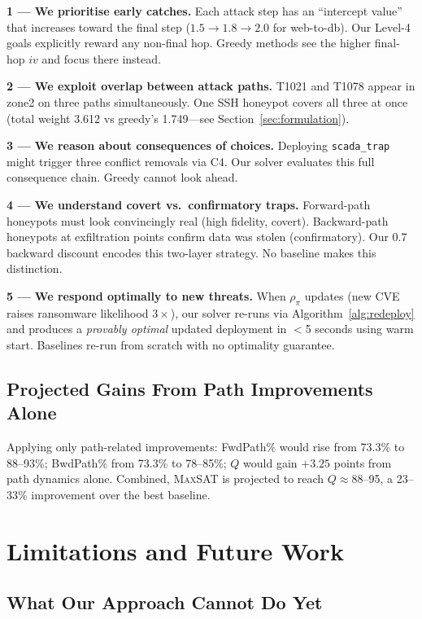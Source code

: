 \documentclass[journal]{IEEEtran}
\newcommand{\maxsat}{\textsc{MaxSAT}}
\begin{document}
\textbf{1 --- We prioritise early catches.}
Each attack step has an ``intercept value'' that increases
toward the final step ($1.5 \to 1.8 \to 2.0$ for
web-to-db).
Our Level-4 goals explicitly reward any non-final hop.
Greedy methods see the higher final-hop $iv$ and focus there
instead.

\textbf{2 --- We exploit overlap between attack paths.}
T1021 and T1078 appear in zone2 on three paths simultaneously.
One SSH honeypot covers all three at once
(total weight 3.612 vs greedy's 1.749---see
Section~\ref{sec:formulation}).

\textbf{3 --- We reason about consequences of choices.}
Deploying \texttt{scada\_trap} might trigger three conflict
removals via C4.
Our solver evaluates this full consequence chain.
Greedy cannot look ahead.

\textbf{4 --- We understand covert vs.\ confirmatory traps.}
Forward-path honeypots must look convincingly real
(high fidelity, covert).
Backward-path honeypots at exfiltration points confirm data
was stolen (confirmatory).
Our 0.7 backward discount encodes this two-layer strategy.
No baseline makes this distinction.

\textbf{5 --- We respond optimally to new threats.}
When $\rho_\pi$ updates (new CVE raises ransomware likelihood
$3\times$), our solver re-runs via Algorithm~\ref{alg:redeploy}
and produces a \emph{provably optimal} updated deployment
in $<$5 seconds using warm start.
Baselines re-run from scratch with no optimality guarantee.

\subsection{Projected Gains From Path Improvements Alone}

Applying only path-related improvements: FwdPath\% would
rise from 73.3\% to 88--93\%; BwdPath\% from 73.3\% to
78--85\%; $Q$ would gain $+3.25$ points from path dynamics
alone.
Combined, \maxsat{} is projected to reach $Q\approx88$--95,
a 23--33\% improvement over the best baseline.

\section{Limitations and Future Work}
\label{sec:discussion}

\subsection{What Our Approach Cannot Do Yet}
\end{document}
